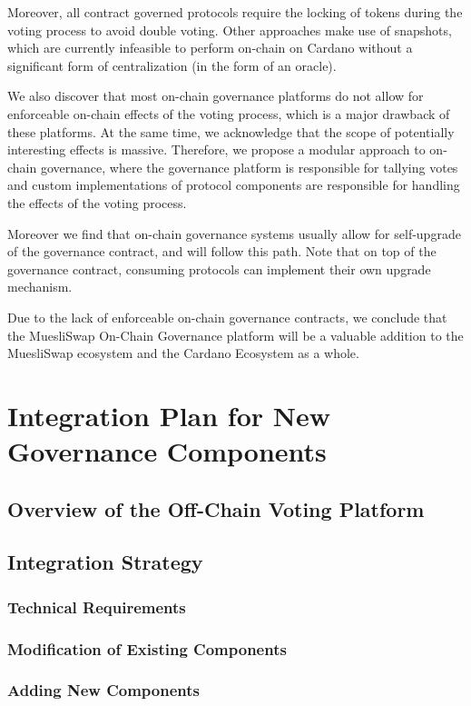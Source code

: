 \documentclass[11pt]{article}
\begin{document}
Moreover, all contract governed protocols require the locking of tokens during the voting process to avoid double voting.
Other approaches make use of snapshots, which are currently infeasible to perform on-chain on Cardano
without a significant form of centralization (in the form of an oracle).

We also discover that most on-chain governance platforms do not allow for enforceable on-chain effects of the voting process,
which is a major drawback of these platforms.
At the same time, we acknowledge that the scope of potentially interesting effects is massive.
Therefore, we propose a modular approach to on-chain governance, where the governance platform is responsible for tallying votes and
custom implementations of protocol components are responsible for handling the effects of the voting process.

Moreover we find that on-chain governance systems usually allow for self-upgrade of the governance contract,
and will follow this path.
Note that on top of the governance contract,
consuming protocols can implement their own upgrade mechanism.

Due to the lack of enforceable on-chain governance contracts, we conclude that the MuesliSwap On-Chain Governance platform will be a valuable addition to the MuesliSwap ecosystem and the Cardano Ecosystem as a whole.

\section{Integration Plan for New Governance Components}
\subsection{Overview of the Off-Chain Voting Platform}
\subsection{Integration Strategy}
\subsubsection{Technical Requirements}
\subsubsection{Modification of Existing Components}
\subsubsection{Adding New Components}
\end{document}
